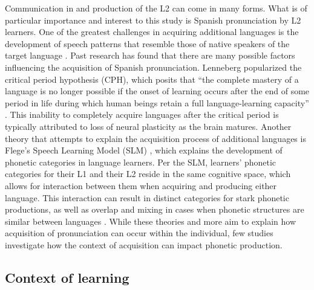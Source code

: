\documentclass[
  a4paper,
  11pt,
  twocolumn]{article}
\begin{document}
Communication in and production of the L2 can come in many forms. What
is of particular importance and interest to this study is Spanish
pronunciation by L2 learners. One of the greatest challenges in
acquiring additional languages is the development of speech patterns
that resemble those of native speakers of the target language
\cite{simonet_l2_2012}. Past research has found that there are many
possible factors influencing the acquisition of Spanish pronunciation.
Lenneberg \cite{lenneberg_biological_1967} popularized the critical
period hypothesis (CPH), which posits that ``the complete mastery of a
language is no longer possible if the onset of learning occurs after the
end of some period in life during which human beings retain a full
language-learning capacity'' \cite{simonet_l2_2012}. This inability to
completely acquire languages after the critical period is typically
attributed to loss of neural plasticity as the brain matures. Another
theory that attempts to explain the acquisition process of additional
languages is Flege's Speech Learning Model (SLM)
\cite{flege_second_1995}, which explains the development of phonetic
categories in language learners. Per the SLM, learners' phonetic
categories for their L1 and their L2 reside in the same cognitive space,
which allows for interaction between them when acquiring and producing
either language. This interaction can result in distinct categories for
stark phonetic productions, as well as overlap and mixing in cases when
phonetic structures are similar between languages
\cite{flege_second_1995}. While these theories and more aim to explain
how acquisition of pronunciation can occur within the individual, few
studies investigate how the context of acquisition can impact phonetic
production.

\subsection{Context of learning}
\end{document}
